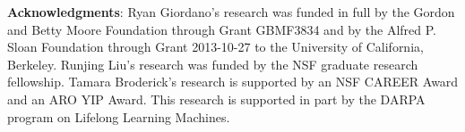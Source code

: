 
\small{
{\bf Acknowledgments}:
Ryan Giordano's research was funded in full by the
Gordon and Betty Moore Foundation through Grant GBMF3834 and by the Alfred P. Sloan Foundation through Grant 2013-10-27 to the University of California, Berkeley. Runjing Liu's research was funded by the NSF graduate research fellowship. Tamara Broderick's research is supported by an NSF CAREER Award and an ARO YIP
Award. This research is supported in part by the DARPA program on
Lifelong Learning Machines.
}
